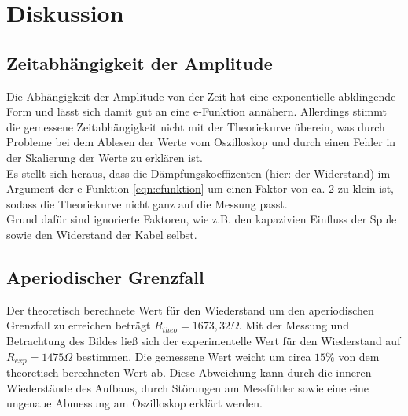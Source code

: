 \newpage
\section{Diskussion}
\label{sec:Diskussion}
\subsection{Zeitabhängigkeit der Amplitude}
Die Abhängigkeit der Amplitude von der Zeit hat eine exponentielle abklingende Form und lässt sich damit gut an eine e-Funktion annähern.
Allerdings stimmt die gemessene Zeitabhängigkeit nicht mit der Theoriekurve überein, was durch Probleme bei dem Ablesen der Werte vom Oszilloskop
und durch einen Fehler in der Skalierung der Werte zu erklären ist.\\
Es stellt sich heraus, dass die Dämpfungskoeffizenten (hier: der Widerstand) im Argument der e-Funktion \ref{eqn:efunktion} um einen Faktor
von ca. 2 zu klein ist, sodass die Theoriekurve nicht ganz auf die Messung passt.\\
Grund dafür sind ignorierte Faktoren, wie z.\;B. den kapazivien Einfluss der Spule sowie den
Widerstand der Kabel selbst.



\subsection{Aperiodischer Grenzfall}
Der theoretisch berechnete Wert für den Wiederstand um den aperiodischen Grenzfall zu erreichen beträgt $R_{theo}=1673,32 \Omega$.
Mit der Messung und Betrachtung des Bildes ließ sich der experimentelle Wert für den Wiederstand auf $R_{exp} = 1475\Omega$ bestimmen.
Die gemessene Wert weicht um circa $15\%$ von dem theoretisch berechneten Wert ab. Diese Abweichung kann durch die inneren Wiederstände des Aufbaus, durch Störungen am Messfühler
sowie eine eine ungenaue Abmessung am Oszilloskop erklärt werden.


